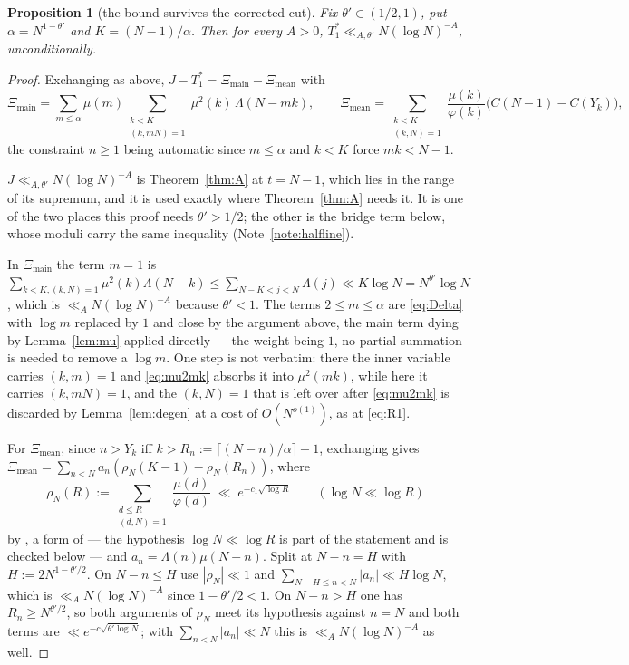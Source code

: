 \documentclass[11pt,a4paper]{article}
\theoremstyle{plain}
\newtheorem{proposition}[theorem]{Proposition}
\theoremstyle{definition}
\theoremstyle{remark}
\begin{document}
\begin{proposition}[the bound survives the corrected cut]%
\label{prop:movingcut}
Fix $\theta'\in(1/2,1)$, put $\alpha=N^{1-\theta'}$ and
$K=(N-1)/\alpha$. Then for every $A>0$,
$T_1^\ast\ll_{A,\theta'}N(\log N)^{-A}$, unconditionally.
\end{proposition}

\begin{proof}
Exchanging as above,
$J-T_1^\ast=\Xi_{\mathrm{main}}-\Xi_{\mathrm{mean}}$ with
\[
  \Xi_{\mathrm{main}}=\sum_{m\le\alpha}\mu(m)\!\!
    \sum_{\substack{k<K\\ (k,mN)=1}}\!\!\mu^2(k)\,\Lambda(N-mk),
  \qquad
  \Xi_{\mathrm{mean}}=\!\!\sum_{\substack{k<K\\(k,N)=1}}\!\!
    \frac{\mu(k)}{\varphi(k)}\bigl(C(N-1)-C(Y_k)\bigr),
\]
the constraint $n\ge1$ being automatic since $m\le\alpha$ and $k<K$
force $mk<N-1$.

$J\ll_{A,\theta'}N(\log N)^{-A}$ is Theorem~\ref{thm:A} at $t=N-1$,
which lies in the range of its supremum, and it is used exactly where
Theorem~\ref{thm:A} needs it. It is one of the two places this proof
needs $\theta'>1/2$; the other is the bridge term below, whose moduli
carry the same inequality (Note~\ref{note:halfline}).

In $\Xi_{\mathrm{main}}$ the term $m=1$ is
$\sum_{k<K,(k,N)=1}\mu^2(k)\Lambda(N-k)\le\sum_{N-K<j<N}\Lambda(j)\ll
K\log N=N^{\theta'}\log N$, which is $\ll_AN(\log N)^{-A}$ because
$\theta'<1$. The terms $2\le m\le\alpha$ are \eqref{eq:Delta} with
$\log m$ replaced by $1$ and close by the argument above, the main term
dying by Lemma~\ref{lem:mu} applied directly --- the weight being $1$,
no partial summation is needed to remove a $\log m$. One step is not
verbatim: there the inner variable carries $(k,m)=1$ and
\eqref{eq:mu2mk} absorbs it into $\mu^2(mk)$, while here it carries
$(k,mN)=1$, and the $(k,N)=1$ that is left over after \eqref{eq:mu2mk}
is discarded by Lemma~\ref{lem:degen} at a cost of $O(N^{o(1)})$, as at
\eqref{eq:R1}.

For $\Xi_{\mathrm{mean}}$, since $n>Y_k$ iff
$k>R_n:=\lceil(N-n)/\alpha\rceil-1$, exchanging gives
$\Xi_{\mathrm{mean}}=\sum_{n<N}a_n(\rho_N(K-1)-\rho_N(R_n))$, where
\[
  \rho_N(R):=\sum_{\substack{d\le R\\ (d,N)=1}}\frac{\mu(d)}{\varphi(d)}
  \;\ll\;e^{-c_1\sqrt{\log R}}
  \qquad(\log N\ll\log R)
\]
by \cite[Lemma~1]{HL}, a form of \cite[Lemma~2.1]{GY} --- the
hypothesis $\log N\ll\log R$ is part of the statement and is checked
below --- and $a_n=\Lambda(n)\mu(N-n)$. Split at $N-n=H$ with
$H:=2N^{1-\theta'/2}$. On $N-n\le H$ use $|\rho_N|\ll1$ and
$\sum_{N-H\le n<N}|a_n|\ll H\log N$, which is $\ll_AN(\log N)^{-A}$
since $1-\theta'/2<1$. On $N-n>H$ one has $R_n\ge N^{\theta'/2}$, so
both arguments of $\rho_N$ meet its hypothesis against $n=N$ and both
terms are $\ll e^{-c\sqrt{\theta'\log N}}$; with
$\sum_{n<N}|a_n|\ll N$ this is $\ll_AN(\log N)^{-A}$ as well.
\end{proof}
\end{document}

